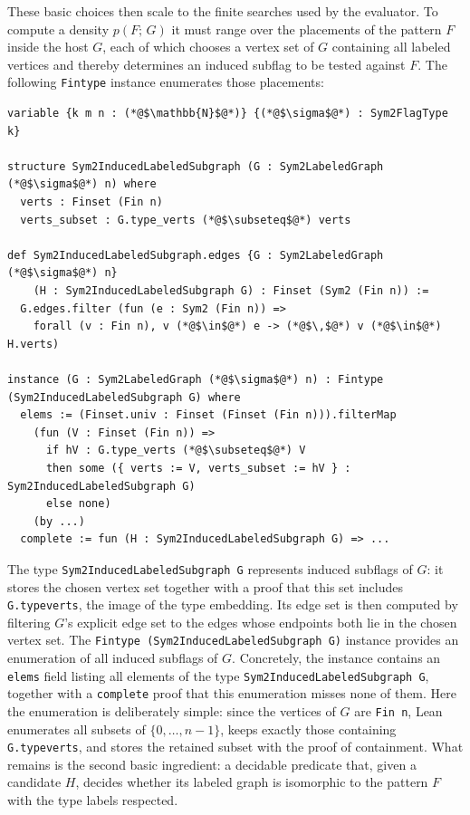 \documentclass[acmsmall,screen=true,acmthm=false]{acmart}
\newcommand{\den}[2]{p(#1;\,#2)}
\DeclareRobustCommand{\lean}[1]{{\def\_{\textunderscore\allowbreak}\texttt{#1}}}
\begin{document}
These basic choices then scale to the finite searches used by the evaluator.
To compute a density \(\den{F}{G}\) it must range over the placements of the
pattern \(F\) inside the host \(G\), each of which chooses a vertex set of
\(G\) containing all labeled vertices and thereby determines an induced subflag
to be tested against \(F\).  The following \lean{Fintype} instance enumerates
those placements:
\begin{lstlisting}
variable {k m n : (*@$\mathbb{N}$@*)} {(*@$\sigma$@*) : Sym2FlagType k}

structure Sym2InducedLabeledSubgraph (G : Sym2LabeledGraph (*@$\sigma$@*) n) where
  verts : Finset (Fin n)
  verts_subset : G.type_verts (*@$\subseteq$@*) verts

def Sym2InducedLabeledSubgraph.edges {G : Sym2LabeledGraph (*@$\sigma$@*) n}
    (H : Sym2InducedLabeledSubgraph G) : Finset (Sym2 (Fin n)) :=
  G.edges.filter (fun (e : Sym2 (Fin n)) =>
    forall (v : Fin n), v (*@$\in$@*) e -> (*@$\,$@*) v (*@$\in$@*) H.verts)

instance (G : Sym2LabeledGraph (*@$\sigma$@*) n) : Fintype (Sym2InducedLabeledSubgraph G) where
  elems := (Finset.univ : Finset (Finset (Fin n))).filterMap
    (fun (V : Finset (Fin n)) =>
      if hV : G.type_verts (*@$\subseteq$@*) V
      then some ({ verts := V, verts_subset := hV } : Sym2InducedLabeledSubgraph G)
      else none)
    (by ...)
  complete := fun (H : Sym2InducedLabeledSubgraph G) => ...
\end{lstlisting}
The type \lean{Sym2InducedLabeledSubgraph G} represents induced subflags
of \(G\): it stores the chosen vertex set together with a proof that this set
includes \lean{G.type\_verts}, the image of the type embedding.  Its edge set
is then computed by filtering
\(G\)'s explicit edge set to the edges whose endpoints both lie in the
chosen vertex set.  The \lean{Fintype (Sym2InducedLabeledSubgraph G)} instance
provides an enumeration of all induced subflags of \(G\).  Concretely,
the instance contains an \lean{elems} field listing all elements of the type \lean{Sym2InducedLabeledSubgraph~G},
together with a \lean{complete} proof that this enumeration misses none of
them.  Here the
enumeration is deliberately simple: since the vertices of \(G\) are
\lean{Fin n}, Lean enumerates all subsets of \(\{0,\ldots,n-1\}\), keeps
exactly those containing \lean{G.type\_verts}, and stores the retained subset
with the proof of containment.
What remains is the second basic ingredient: a decidable predicate that, given
a candidate \(H\), decides whether its labeled graph is isomorphic to the
pattern \(F\) with the type labels respected.
\end{document}
